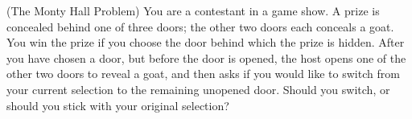 \begin{exercise}
\begin{questions}
%

\question (The Monty Hall Problem)
You are a contestant in a game show. A prize is concealed behind one of three doors; the other two doors each conceals a goat. You win the prize if you choose the door behind which the prize is hidden. After you have chosen a door, but before the door is opened, the host opens one of the other two doors to reveal a goat, and then asks if you would like to switch from your current selection to the remaining unopened door. Should you switch, or should you stick with your original selection?


\end{questions}
\end{exercise}
